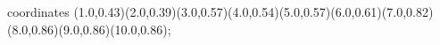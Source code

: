 					coordinates { (1.0,0.43)(2.0,0.39)(3.0,0.57)(4.0,0.54)(5.0,0.57)(6.0,0.61)(7.0,0.82)(8.0,0.86)(9.0,0.86)(10.0,0.86)};